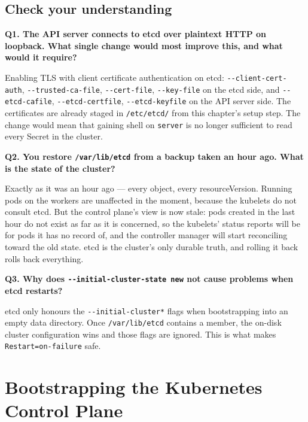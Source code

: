 \documentclass[11pt,oneside]{report}
\begin{document}
\hypertarget{check-your-understanding-7}{%
\section{Check your
understanding}\label{check-your-understanding-7}}

\textbf{Q1. The API
server connects to
etcd over plaintext
HTTP on loopback.
What single change
would most improve
this, and what would
it require?}

Enabling TLS with
client certificate
authentication on
etcd:
\texttt{-\/-client-}\allowbreak{}\texttt{cert-}\allowbreak{}\texttt{auth},
\texttt{-\/-trusted-}\allowbreak{}\texttt{ca-}\allowbreak{}\texttt{file},
\texttt{-\/-cert-file},
\texttt{-\/-key-file}
on the etcd side,
and
\texttt{-\/-etcd-cafile},
\texttt{-\/-etcd-certfile},
\texttt{-\/-etcd-keyfile}
on the API server
side. The
certificates are
already staged in
\texttt{/etc/etcd/}
from this chapter's
setup step. The
change would mean
that gaining shell
on \texttt{server}
is no longer
sufficient to read
every Secret in the
cluster.

\textbf{Q2. You
restore
\texttt{/var/lib/etcd}
from a backup taken
an hour ago. What is
the state of the
cluster?}

Exactly as it was an
hour ago --- every
object, every
resourceVersion.
Running pods on the
workers are
unaffected in the
moment, because the
kubelets do not
consult etcd. But
the control plane's
view is now stale:
pods created in the
last hour do not
exist as far as it
is concerned, so the
kubelets' status
reports will be for
pods it has no
record of, and the
controller manager
will start
reconciling toward
the old state. etcd
is the cluster's
only durable truth,
and rolling it back
rolls back
everything.

\textbf{Q3. Why does
\texttt{-\/-initial-}\allowbreak{}\texttt{cluster-}\allowbreak{}\texttt{state\ new}
not cause problems
when etcd restarts?}

etcd only honours
the
\texttt{-\/-initial-}\allowbreak{}\texttt{cluster*}
flags when
bootstrapping into
an empty data
directory. Once
\texttt{/var/lib/etcd}
contains a member,
the on-disk cluster
configuration wins
and those flags are
ignored. This is
what makes
\texttt{Restart=on-}\allowbreak{}\texttt{failure}
safe.

\hypertarget{chap-8}{%
\chapter{Bootstrapping
the Kubernetes
Control
Plane}\label{chap-8}}
\end{document}
